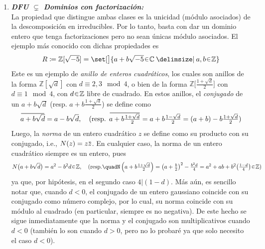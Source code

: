 \begin{sol}
\begin{enumerate}[label={\bfseries\Roman*}., wide, itemsep=1em]
\item{}
\emph{\bfseries DFU $\subsetneq$ Dominios con factorización:}\\
La propiedad que distingue ambas clases es la unicidad (módulo asociados) de la descomposición en irreducibles. Por lo tanto, basta con dar un dominio entero que tenga factorizaciones pero no sean únicas módulo asociados. El ejemplo más conocido con dichas propiedades es 
\[
R \coloneq \mathbb{Z}[\sqrt{-5}] = \set[\big]{a + b\sqrt{-5} \en \mathbb{C} \given a,b\en \mathbb{Z}}
\] 
Este es un ejemplo de \emph{anillo de enteros cuadráticos}, los cuales son anillos de la forma $\mathbb{Z}[\sqrt{d}]$ con $d \equiv 2,3 \mod 4$, o bien de la forma $\mathbb{Z}\big[\frac{1+\sqrt{d}}{2}\big]$ con $d \equiv 1 \mod 4$, con $d \en \mathbb{Z}$ libre de cuadrado. En estos anillos, el \emph{conjugado} de un $a + b\sqrt{d}$ (resp. $a+b\frac{1+\sqrt{d}}{2}$) se define como
\[
\ubar{a+b\sqrt{d}} = a - b\sqrt{d},%
\quad\text{(resp. $\ubar{a+b\tfrac{1+\sqrt{d}}{2}} = a+b\tfrac{1-\sqrt{d}}{2} = (a+b) - b\tfrac{1+\sqrt{d}}{2}$)}
\]
Luego, la \emph{norma} de un entero cuadrático $z$ se define como su producto con su conjugado, i.e., $N(z) = z\ubar{z}$. En cualquier caso, la norma de un entero cuadrático siempre es un entero, pues
\[
N\big(a + b\sqrt{d}\big) = a^2 - b^2d \en \mathbb{Z},
\quad(\text{resp.}\quad%
N\left(a+b\tfrac{1+\sqrt{d}}{2}\right) = \big(a + \tfrac{b}{2}\big)^2-\tfrac{b^2d}{4} = a^2 + ab + b^2\big(\tfrac{1-d}{4}\big) \en \mathbb{Z})
\]
ya que, por hipótesis, en el segundo caso $4|(1-d)$. Más aún, es sencillo notar que, cuando $d<0$, el conjugado de un entero gaussiano coincide con su conjugado como número complejo, por lo cual, su norma coincide con su módulo al cuadrado (en particular, siempre es no negativa). De este hecho se sigue inmediatamente que la norma y el conjugado son multiplicativos cuando $d < 0$ (también lo son cuando $d>0$, pero no lo probaré ya que solo necesito el caso $d<0$).


\end{enumerate}
\end{sol}
